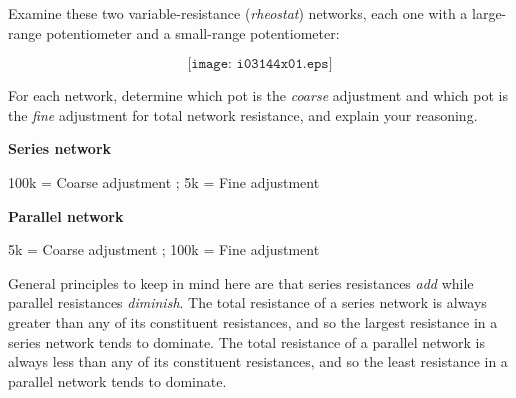 

Examine these two variable-resistance ({\it rheostat}) networks, each one with a large-range potentiometer and a small-range potentiometer:

$$\texttt{[image: i03144x01.eps]}$$

For each network, determine which pot is the {\it coarse} adjustment and which pot is the {\it fine} adjustment for total network resistance, and explain your reasoning.







\noindent
{\bf Series network}

100k = Coarse adjustment ; 5k = Fine adjustment

\vskip 10pt

\noindent
{\bf Parallel network}

5k = Coarse adjustment ; 100k = Fine adjustment

\vskip 10pt

General principles to keep in mind here are that series resistances {\it add} while parallel resistances {\it diminish}.  The total resistance of a series network is always greater than any of its constituent resistances, and so the largest resistance in a series network tends to dominate.  The total resistance of a parallel network is always less than any of its constituent resistances, and so the least resistance in a parallel network tends to dominate.











